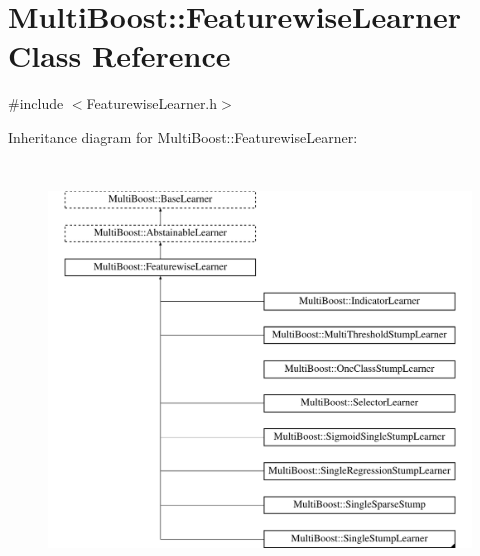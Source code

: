 \hypertarget{classMultiBoost_1_1FeaturewiseLearner}{
\section{MultiBoost::FeaturewiseLearner Class Reference}
\label{classMultiBoost_1_1FeaturewiseLearner}
}


{\ttfamily \#include $<$FeaturewiseLearner.h$>$}

Inheritance diagram for MultiBoost::FeaturewiseLearner:\begin{figure}[H]
\begin{center}
\leavevmode
\includegraphics[height=11.000000cm]{classMultiBoost_1_1FeaturewiseLearner}
\end{center}
\end{figure}
